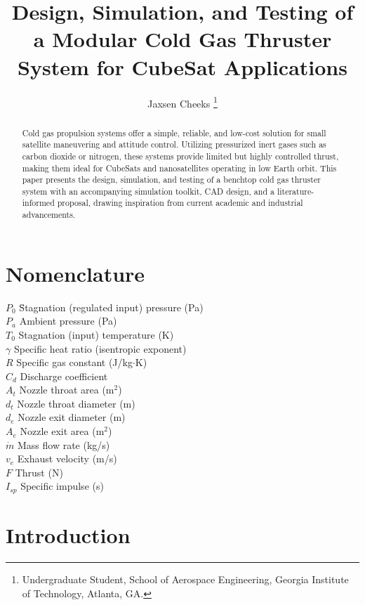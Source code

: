 \documentclass{new-aiaa}
\title{Design, Simulation, and Testing of a Modular Cold Gas Thruster System for CubeSat Applications}
\author{Jaxsen Cheeks \thanks{Undergraduate Student, School of Aerospace Engineering, Georgia Institute of Technology, Atlanta, GA.}}
\begin{document}
\maketitle

\begin{abstract}
Cold gas propulsion systems offer a simple, reliable, and low-cost solution for small satellite maneuvering and attitude control. Utilizing pressurized inert gases such as carbon dioxide or nitrogen, these systems provide limited but highly controlled thrust, making them ideal for CubeSats and nanosatellites operating in low Earth orbit. This paper presents the design, simulation, and testing of a benchtop cold gas thruster system with an accompanying simulation toolkit, CAD design, and a literature-informed proposal, drawing inspiration from current academic and industrial advancements.
\end{abstract}

\section*{Nomenclature}
\begin{tabbing}
    $P_0$ \quad \= Stagnation (regulated input) pressure (Pa) \\
    $P_a$ \> Ambient pressure (Pa) \\
    $T_0$ \> Stagnation (input) temperature (K) \\
    $\gamma$ \> Specific heat ratio (isentropic exponent) \\
    $R$ \> Specific gas constant (J/kg$\cdot$K) \\
    $C_d$ \> Discharge coefficient \\
    $A_t$ \> Nozzle throat area (m$^2$) \\
    $d_t$ \> Nozzle throat diameter (m) \\
    $d_e$ \> Nozzle exit diameter (m) \\
    $A_e$ \> Nozzle exit area (m$^2$) \\
    $\dot{m}$ \> Mass flow rate (kg/s) \\
    $v_e$ \> Exhaust velocity (m/s) \\
    $F$ \> Thrust (N) \\
    $I_{sp}$ \> Specific impulse (s) \\
\end{tabbing}


\section{Introduction}
\end{document}
